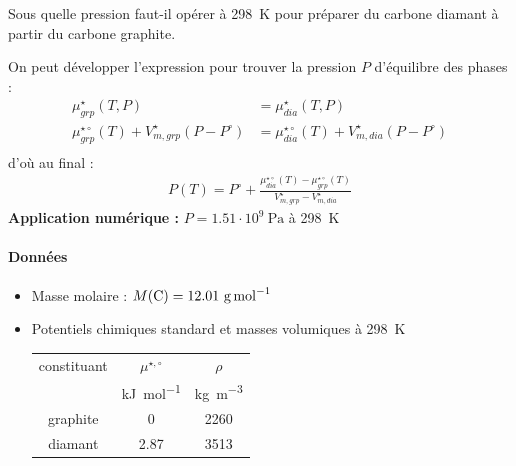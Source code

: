 \begin{exercise}
\begin{questions}
\question Sous quelle pression faut-il opérer à \SI{298}{\kelvin} pour préparer du carbone diamant à partir du carbone graphite. 
\begin{solution}
On peut développer l'expression pour trouver la pression $P$ d'équilibre des phases :
\begin{align*}
\mu^\star_{grp} (T,P) &= \mu^\star_{dia} (T,P) \\
\mu^{\star \circ}_{grp} (T) + V^\star_{m, grp} (P-P^\circ) &= \mu^{\star \circ}_{dia} (T) + V^\star_{m, dia} (P-P^\circ) \\
\end{align*}
d'où au final : 
\begin{align*}
P (T) = P^\circ + \frac{\mu^{\star \circ}_{dia} (T) - \mu^{\star \circ}_{grp} (T)}{V^\star_{m, grp} - V^\star_{m, dia}}
\end{align*}
\textbf{Application numérique :} $P = 1.51 \cdot 10^9 ~ \si{\pascal}$ à \SI{298}{\kelvin}
\end{solution}
\end{questions}


\paragraph*{Données}
\begin{itemize}
\item Masse molaire : $M(\ce{C}) = 12.01 ~ \si{\gram\per\mole}$
\item Potentiels chimiques standard et masses volumiques à \SI{298}{\kelvin} 
\begin{center}
\begin{tabular}{ccc}
\toprule
constituant & $\mu^{\star, \circ}$ & $\rho$ \\
& \si{\kilo\joule\per\mole} & \si{\kilo\gram\per\meter\cubed} \\
\midrule
graphite & 0 & 2260 \\
diamant & 2.87 & 3513 \\
\bottomrule
\end{tabular}
\end{center}
\end{itemize}

\end{exercise}